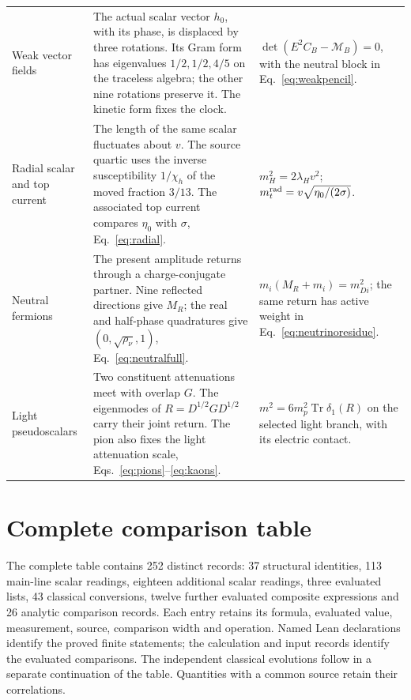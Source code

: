 \documentclass[aps,prx,onecolumn,10pt,notitlepage,nofootinbib,longbibliography]{revtex4-2}
\numberwithin{equation}{section}
\numberwithin{table}{section}
\newcommand{\Tr}{\operatorname{Tr}}
\begin{document}
\begin{longtable}{@{}>{\raggedright\arraybackslash}p{}>{\raggedright\arraybackslash}p{}>{\raggedright\arraybackslash}p{}@{}}
Weak vector fields&The actual scalar vector $h_0$, with its phase, is displaced by three rotations. Its Gram form has eigenvalues $1/2,1/2,4/5$ on the traceless algebra; the other nine rotations preserve it. The kinetic form fixes the clock.&$\det(E^2C_B-\mathcal M_B)=0$, with the neutral block in Eq.~\eqref{eq:weakpencil}.\\[6pt]
Radial scalar and top current&The length of the same scalar fluctuates about $v$. The source quartic uses the inverse susceptibility $1/\chi_h$ of the moved fraction $3/13$. The associated top current compares $\eta_0$ with $\sigma$, Eq.~\eqref{eq:radial}.&$m_H^2=2\lambda_Hv^2$; $m_t^{\rm rad}=v\sqrt{\eta_0/(2\sigma)}$.\\[6pt]
Neutral fermions&The present amplitude returns through a charge-conjugate partner. Nine reflected directions give $M_R$; the real and half-phase quadratures give $(0,\sqrt{\rho_\nu},1)$, Eq.~\eqref{eq:neutralfull}.&$m_i(M_R+m_i)=m_{Di}^2$; the same return has active weight in Eq.~\eqref{eq:neutrinoresidue}.\\[6pt]
Light pseudoscalars&Two constituent attenuations meet with overlap $G$. The eigenmodes of $R=D^{1/2}GD^{1/2}$ carry their joint return. The pion also fixes the light attenuation scale, Eqs.~\eqref{eq:pions}--\eqref{eq:kaons}.&$m^2=6m_p^2\Tr\delta_1(R)$ on the selected light branch, with its electric contact.\\
\end{longtable}
\endgroup

\section{Complete comparison table}
\label{sec:register}
The complete table contains 252 distinct records: 37 structural identities,
113 main-line scalar readings, eighteen additional scalar readings, three
evaluated lists, 43 classical conversions, twelve further evaluated composite
expressions and 26 analytic comparison records.
Each entry retains its formula, evaluated value,
measurement, source, comparison width and operation. Named Lean declarations identify the proved finite statements; the calculation and input records identify the evaluated comparisons.
The independent classical evolutions follow in a separate continuation of the
table. Quantities with a common source retain their correlations.
\end{document}
